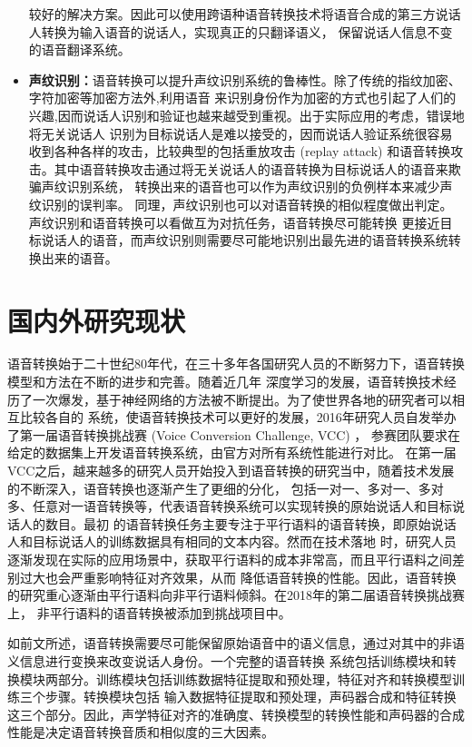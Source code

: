\begin{itemize}
    较好的解决方案。因此可以使用跨语种语音转换技术将语音合成的第三方说话人转换为输入语音的说话人，实现真正的只翻译语义，
    保留说话人信息不变的语音翻译系统\cite{desai2010spectral}。
    \item \textbf{声纹识别：}语音转换可以提升声纹识别系统的鲁棒性。除了传统的指纹加密、字符加密等加密方法外,利用语音
    来识别身份作为加密的方式也引起了人们的兴趣,因而说话人识别和验证也越来越受到重视。出于实际应用的考虑，错误地将无关说话人
    识别为目标说话人是难以接受的，因而说话人验证系统很容易收到各种各样的攻击，比较典型的包括重放攻击 (replay attack) 
    和语音转换攻击。其中语音转换攻击通过将无关说话人的语音转换为目标说话人的语音来欺骗声纹识别系统，
    转换出来的语音也可以作为声纹识别的负例样本来减少声纹识别的误判率\cite{kinnunen2012vulnerability}。
    同理，声纹识别也可以对语音转换的相似程度做出判定。声纹识别和语音转换可以看做互为对抗任务，语音转换尽可能转换
    更接近目标说话人的语音，而声纹识别则需要尽可能地识别出最先进的语音转换系统转换出来的语音。

\end{itemize}

\section{国内外研究现状}
语音转换始于二十世纪80年代，在三十多年各国研究人员的不断努力下，语音转换模型和方法在不断的进步和完善。随着近几年
深度学习的发展，语音转换技术经历了一次爆发，基于神经网络的方法被不断提出。为了使世界各地的研究者可以相互比较各自的
系统，使语音转换技术可以更好的发展，2016年研究人员自发举办了第一届语音转换挑战赛 (Voice Conversion Challenge, VCC) ，
参赛团队要求在给定的数据集上开发语音转换系统，由官方对所有系统性能进行对比\cite{toda2016voice,wester2016analysis}。
在第一届VCC之后，越来越多的研究人员开始投入到语音转换的研究当中，随着技术发展的不断深入，语音转换也逐渐产生了更细的分化，
包括一对一、多对一、多对多、任意对一语音转换等，代表语音转换系统可以实现转换的原始说话人和目标说话人的数目。最初
的语音转换任务主要专注于平行语料的语音转换，即原始说话人和目标说话人的训练数据具有相同的文本内容。然而在技术落地
时，研究人员逐渐发现在实际的应用场景中，获取平行语料的成本非常高，而且平行语料之间差别过大也会严重影响特征对齐效果，从而
降低语音转换的性能。因此，语音转换的研究重心逐渐由平行语料向非平行语料倾斜。在2018年的第二届语音转换挑战赛上，
非平行语料的语音转换被添加到挑战项目中\cite{lorenzo2018voice}。

如前文所述，语音转换需要尽可能保留原始语音中的语义信息，通过对其中的非语义信息进行变换来改变说话人身份。一个完整的语音转换
系统包括训练模块和转换模块两部分。训练模块包括训练数据特征提取和预处理，特征对齐和转换模型训练三个步骤。转换模块包括
输入数据特征提取和预处理，声码器合成和特征转换这三个部分。因此，声学特征对齐的准确度、转换模型的转换性能和声码器的合成
性能是决定语音转换音质和相似度的三大因素。

